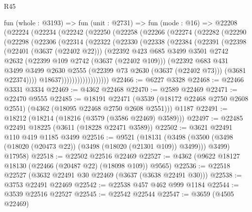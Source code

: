 \begin{lexlean}{R45}
\begin{coremodule}
    fun (whole : @3193) =>
    fun (unit : @2731) =>
    fun (mode : @16) =>
    @22208
      (@22224
        (@22234
          (@22242
            (@22250
              (@22258
                (@22266
                  (@22274
                    (@22282
                      (@22290
                        (@22298
                          (@22306
                            (@22314
                              (@22322
                                (@22330
                                  (@22338
                                    (@22384
                                      (@22391
                                        (@22398
                                          (@22401 (@3637 (@22402 @22)))
                                          (@22392
                                            @423
                                            @685
                                            @3499
                                            @3501
                                            @2742
                                            @2632
                                            (@22399 @109 @2742 (@3637 (@22402 @109)))
                                            (@22392
                                              @683
                                              @431
                                              @3499
                                              @3499
                                              @2630
                                              @2555
                                              (@22399 @73 @2630 (@3637 (@22402 @73)))
                                              (@3681 @22374))))
                                        @18637))))))))))))))))))
@22466 := @6227 @3328
@22468 := @22466 @3331 @3334
@22469 := @4362 @22468
@22470 := @2589 @22469
@22471 := @22470 @9555
@22485 := @18191
    @22471
    (@3539 (@18172 @22468 @2750 @2608 @2551) (@4362 (@18095 @22468 @2750 @2608 @2551)))
    @1187
@22491 := @18212 (@18214 (@18216 (@3579 (@3586 @22469) @3589)))
@22497 := @22485 @22491 @18225 (@3611 (@18228 @22471 @3589))
@22502 := @3621 @22491 @110 @419 @1185 @3499
@22516 := @9521
    (@18131
      (@3498 (@3500 (@3498 (@18020 (@20473 @22)) (@3498 (@18020 (@21301 @109)) @3499))) @3499)
      @17958)
@22518 := @22502 @22516 @22469
@22527 := @4362 (@9622 @18127 @18130 (@22466 (@20487 @22) (@18098 @109)) @9565)
@22536 := @22518 @22527 (@3632 @22491 @30 @22469 (@3637 (@3638 @22491 @30)))
@22538 := @3753 @22491 @22469
@22542 := @22538 @457 @462 @999 @1184
@22544 := @3539 @22516 @22527
@22545 := @22542 @22544
@22547 := @3659 (@4505 @22469)

\end{coremodule}
\end{lexlean}
